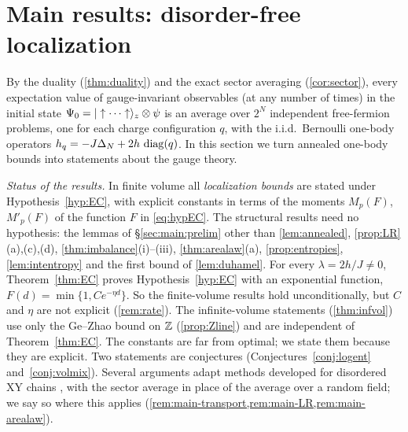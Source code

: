 \providecommand{\cdr}{\tilde c}
\providecommand{\bent}{\mathsf{h}}           %
\providecommand{\Hsh}{\mathrm{H}}            %
\providecommand{\Sfm}{S_{f}}                 %
\providecommand{\Ibar}{\bar I}
\providecommand{\rhoqf}[1]{\rho[#1]}         %
\providecommand{\Alg}{\mathfrak{A}}
\providecommand{\BAlg}{\mathfrak{B}}
\providecommand{\GAlg}{\mathfrak{G}}
\providecommand{\SigF}{\Sigma_1(F)}
\providecommand{\SigpF}{\Sigma_1'(F)}
\providecommand{\ThF}{\Theta(F)}
\providecommand{\FZ}{F_{\Z}}
\providecommand{\Zone}{\one_N}

\section{Main results: disorder-free localization}\label{sec:main}

By the duality (\cref{thm:duality}) and the exact sector averaging (\cref{cor:sector}), every
expectation value of gauge-invariant observables (at any number of times) in the initial state
$\Psi_0=|\uparrow\cdots\uparrow\rangle_z\otimes\psi$ is an average over $2^N$ independent free-fermion
problems, one for each charge configuration $q$, with the i.i.d.\ Bernoulli one-body operators
$h_{q}=-J\Delta_N+2h\,\operatorname{diag}(q)$.  In this section we turn annealed one-body bounds into
statements about the gauge theory.

\emph{Status of the results.}  In finite volume all \emph{localization bounds} are stated under
Hypothesis~\ref{hyp:EC}, with explicit constants in terms of the moments $M_p(F)$, $M'_p(F)$ of
the function $F$ in \eqref{eq:hypEC}.  The structural results need no hypothesis: the lemmas of
\S\ref{sec:main:prelim} other than \cref{lem:annealed}, \cref{prop:LR}(a),(c),(d),
\cref{thm:imbalance}(i)--(iii), \cref{thm:arealaw}(a), \cref{prop:entropies}, \cref{lem:intentropy}
and the first bound of \cref{lem:duhamel}.
For every $\lambda=2h/J\neq0$, Theorem~\ref{thm:EC} proves Hypothesis~\ref{hyp:EC} with an exponential
function, $F(d)=\min\{1,Ce^{-\eta d}\}$.  So the finite-volume results hold unconditionally, but $C$ and $\eta$
are not explicit (\cref{rem:rate}).  The infinite-volume
statements (\cref{thm:infvol}) use only the Ge--Zhao bound on $\mathbb{Z}$ (\cref{prop:Zline}) and are
independent of Theorem~\ref{thm:EC}.  The constants are far from optimal; we state them because they
are explicit.  Two statements are conjectures (Conjectures~\ref{conj:logent} and~\ref{conj:volmix}).
Several arguments adapt methods developed for disordered XY chains
\cite{HSS2012,AbdulRahmanStolz2015,ANSS2016}, with the sector average in place of the average over a random
field; we say so where this applies (\cref{rem:main-transport,rem:main-LR,rem:main-arealaw}).

